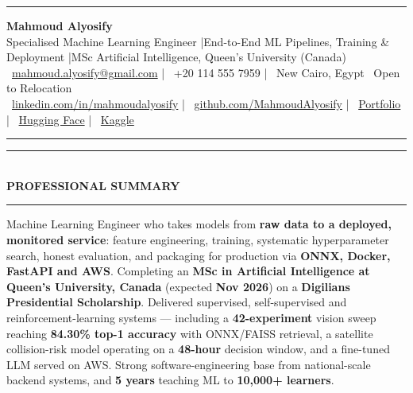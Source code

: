 \documentclass[10pt, a4paper]{article}
\newcommand{\faEnvelope}{}\newcommand{\faPhone}{}\newcommand{\faMapMarker}{}%
\newcommand{\faLinkedin}{}\newcommand{\faGithub}{}\newcommand{\faRobot}{}%
\newcommand{\faChartBar}{}\newcommand{\faGlobe}{}%
\newcommand{\cvsection}[1]{%
  \vspace{3pt}%
  {\color{navy}\rule{\linewidth}{1.1pt}}\\[0.5pt]%
  {\color{navy}\bfseries\fontsize{9.5}{11}\selectfont\uppercase{#1}}\\[-4pt]%
  {\color{teal}\rule{\linewidth}{0.6pt}}%
  \vspace{2pt}%
}
\begin{document}
\small

{\color{navy}\rule{\linewidth}{1.5pt}}

\vspace{3pt}
\begin{center}
  {\fontsize{21}{24}\bfseries\color{navy} Mahmoud Alyosify}\\[3pt]
  {\fontsize{10}{12}\color{teal}
    Specialised Machine Learning Engineer \enspace|\enspace End-to-End ML Pipelines, Training \& Deployment
    \enspace|\enspace MSc Artificial Intelligence, Queen's University (Canada)
}\\[4pt]
  {\color{midgray}
    \faEnvelope\ \href{mailto:mahmoud.alyosify@gmail.com}{mahmoud.alyosify@gmail.com}
    \enspace|\enspace
    \faPhone\ +20 114 555 7959
    \enspace|\enspace
    \faMapMarker\ New Cairo, Egypt \textperiodcentered\ Open to Relocation}\\[2pt]
  {\faLinkedin\ \href{https://linkedin.com/in/mahmoudalyosify}{linkedin.com/in/mahmoudalyosify}
    \enspace|\enspace
    \faGithub\ \href{https://github.com/MahmoudAlyosify}{github.com/MahmoudAlyosify}
    \enspace|\enspace
    \faGlobe\ \href{https://mahmoudalyosifysite.github.io/}{Portfolio}
    \enspace|\enspace
    \faRobot\ \href{https://huggingface.co/mahmoudalyosify}{Hugging Face}
    \enspace|\enspace
    \faChartBar\ \href{https://kaggle.com/mahmoudalyosify}{Kaggle}}
\end{center}

{\color{navy}\rule{\linewidth}{1.5pt}}

\vspace{2pt}

\cvsection{Professional Summary}

{\color{darkgray}\justifying
Machine Learning Engineer who takes models from \textbf{raw data to a deployed, monitored service}: feature engineering, training, systematic hyperparameter search, honest evaluation, and packaging for production via \textbf{ONNX, Docker, FastAPI and AWS}. Completing an \textbf{MSc in Artificial Intelligence at Queen's University, Canada} (expected \textbf{Nov 2026}) on a \textbf{Digilians Presidential Scholarship}. Delivered supervised, self-supervised and reinforcement-learning systems --- including a \textbf{42-experiment} vision sweep reaching \textbf{84.30\% top-1 accuracy} with ONNX/FAISS retrieval, a satellite collision-risk model operating on a \textbf{48-hour} decision window, and a fine-tuned LLM served on AWS. Strong software-engineering base from national-scale backend systems, and \textbf{5 years} teaching ML to \textbf{10,000+ learners}.}
\end{document}
